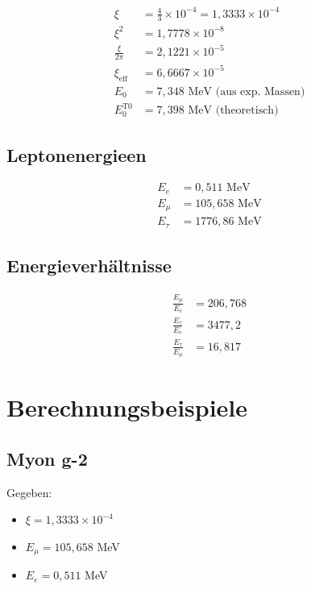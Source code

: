 	\begin{align}
		\xi &= \frac{4}{3} \times 10^{-4} = 1{,}3333 \times 10^{-4} \\
		\xi^2 &= 1{,}7778 \times 10^{-8} \\
		\frac{\xi}{2\pi} &= 2{,}1221 \times 10^{-5} \\
		\xi_{\text{eff}} &= 6{,}6667 \times 10^{-5} \\
		E_0 &= 7{,}348 \text{ MeV (aus exp. Massen)} \\
		E_0^{\text{T0}} &= 7{,}398 \text{ MeV (theoretisch)}
	\end{align}
	
	\subsection{Leptonenergieen}
	
	\begin{align}
		E_e &= 0{,}511 \text{ MeV} \\
		E_\mu &= 105{,}658 \text{ MeV} \\
		E_\tau &= 1776{,}86 \text{ MeV}
	\end{align}
	
	\subsection{Energieverhältnisse}
	
	\begin{align}
		\frac{E_\mu}{E_e} &= 206{,}768 \\
		\frac{E_\tau}{E_e} &= 3477{,}2 \\
		\frac{E_\tau}{E_\mu} &= 16{,}817
	\end{align}
	
	\section{Berechnungsbeispiele}
	\label{sec:calculations}
	
	\subsection{Myon g-2}
	
	Gegeben:
	\begin{itemize}
		\item $\xi = 1{,}3333 \times 10^{-4}$
		\item $E_\mu = 105{,}658$ MeV
		\item $E_e = 0{,}511$ MeV
	\end{itemize}
	
